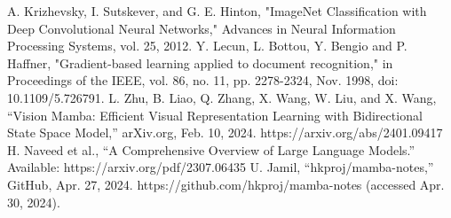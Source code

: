 \documentclass[conference]{IEEEtran}
\begin{document}
\begin{thebibliography}{00}
     A. Krizhevsky, I. Sutskever, and G. E. Hinton, "ImageNet Classification with Deep Convolutional Neural Networks," Advances in Neural Information Processing Systems, vol. 25, 2012.
     Y. Lecun, L. Bottou, Y. Bengio and P. Haffner, "Gradient-based learning applied to document recognition," in Proceedings of the IEEE, vol. 86, no. 11, pp. 2278-2324, Nov. 1998, doi: 10.1109/5.726791.
     L. Zhu, B. Liao, Q. Zhang, X. Wang, W. Liu, and X. Wang, “Vision Mamba: Efficient Visual Representation Learning with Bidirectional State Space Model,” arXiv.org, Feb. 10, 2024. https://arxiv.org/abs/2401.09417   
     H. Naveed et al., “A Comprehensive Overview of Large Language Models.” Available: https://arxiv.org/pdf/2307.06435
     U. Jamil, “hkproj/mamba-notes,” GitHub, Apr. 27, 2024. https://github.com/hkproj/mamba-notes (accessed Apr. 30, 2024).
\end{thebibliography}
\end{document}
